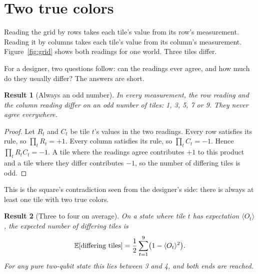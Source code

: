 \documentclass[11pt,a4paper]{article}
\newcommand{\expect}[1]{\langle #1\rangle}
\theoremstyle{qresult}
\newtheorem{result}{Result}
\begin{document}
\section{Two true colors}
\label{sec:two}

Reading the grid by rows takes each tile's value from its row's measurement. Reading it by columns takes each tile's
value from its column's measurement. Figure~\ref{fig:grid} shows both readings for one world. Three tiles differ.


For a designer, two questions follow: can the readings ever agree, and how much do they usually differ? The answers
are short.

\begin{result}[Always an odd number]\label{res:odd}
In every measurement, the row reading and the column reading differ on an odd number of tiles: 1, 3, 5, 7 or 9.
They never agree everywhere.
\end{result}

\begin{proof}
Let $R_t$ and $C_t$ be tile $t$'s values in the two readings. Every row satisfies its rule, so $\prod_t R_t = +1$.
Every column satisfies its rule, so $\prod_t C_t = -1$. Hence $\prod_t R_t C_t = -1$. A tile where the readings
agree contributes $+1$ to this product and a tile where they differ contributes $-1$, so the number of differing
tiles is odd.
\end{proof}

\noindent This is the square's contradiction seen from the designer's side: there is always at least one tile with
two true colors.

\begin{result}[Three to four on average]\label{res:mean}
On a state where tile $t$ has expectation $\expect{O_t}$, the expected number of differing tiles is
\begin{equation}
  \mathbb{E}[\textup{differing tiles}] = \frac12 \sum_{t=1}^{9} \bigl(1 - \expect{O_t}^2\bigr).
\end{equation}
For any pure two-qubit state this lies between 3 and 4, and both ends are reached.
\end{result}
\end{document}
